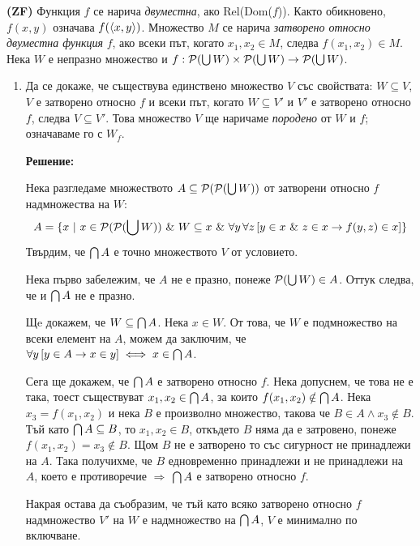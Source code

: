 
\begin{problem}
\textbf{(ZF)}
Функция $f$ се нарича \textit{двуместна}, ако Rel(Dom($f$)). Както обикновено,
$f(x, y)$ означава $f (\langle x, y \rangle)$. Множество $M$ се нарича
\textit{затворено относно двуместна функция} $f$,
ако всеки път, когато $x_1, x_2 \in M$, следва $f(x_1, x_2) \in M$.
Нека $W$ е непразно множество и $f: \mathcal{P}(\bigcup W) \times \mathcal{P}(\bigcup W) \to \mathcal{P}(\bigcup W)$.
\begin{enumerate}
\item Да се докаже, че съществува единствено множество $V$ със свойствата:
$W \subseteq V$, $V$ е затворено относно $f$ и всеки път, когато $W \subseteq V'$
и $V'$ е затворено относно $f$, следва $V \subseteq V'$. Това множество $V$ ще
наричаме \textit{породено} от $W$ и $f$; означаваме го с $W_f$.

\textbf{Решение:}

\smallbreak
\quad
Нека разгледаме множеството $A \subseteq \mathcal{P}(\mathcal{P}(\bigcup W))$ от затворени относно $f$ надмножества на $W$:
\[
	A = \{x\ |\ x \in \mathcal{P}(\mathcal{P}(\bigcup W)) \ \&\  W \subseteq x \ \&\  \forall y\, \forall z\, [ y \in x \ \&\  z \in x \to f(y, z) \in x ] \}
\]
\quad
Твърдим, че $\bigcap A$ е точно множеството $V$ от условието.

\begin{tcolorbox}[mybox={Доказателство:}]
\quad
Нека първо забележим, че $A$ не е празно, понеже $\mathcal{P}(\bigcup W) \in A$. Оттук следва, че и $\bigcap A$ не е празно.

\quad
Щe докажем, че $W \subseteq \bigcap A$. Нека $x \in W$.
От това, че $W$ е подмножество на всеки елемент на $A$, можем да заключим, че $\forall y\, [y \in A \to x \in y] \iff x \in \bigcap A$.

\quad
Сега ще докажем, че $\bigcap A$ е затворено относно $f$.
Нека допуснем, че това не е така, тоест съществуват $x_1, x_2 \in \bigcap A$,
за които $f(x_1, x_2) \notin \bigcap A$.
Нека $x_3 = f(x_1, x_2)$ и нека $B$ е произволно множество, такова че $B \in A \land x_3 \notin B$.
Тъй като $\bigcap A \subseteq B$, то $x_1, x_2 \in B$, откъдето $B$ няма да е затровено, понеже
$f(x_1, x_2) = x_3 \notin B$. Щом $B$ не е затворено то със сигурност не принадлежи на $A$.
Така получихме, че $B$ едновременно принадлежи и не принадлежи на $A$, което е противоречие
$\Rightarrow$ $\bigcap A$ е затворено относно $f$.

\quad
Накрая остава да съобразим, че
тъй като всяко затворено относно $f$ надмножество $V'$ на $W$ е надмножество на $\bigcap A$,
$V$ е минимално по включване.


\end{tcolorbox}
\end{enumerate}
\end{problem}
